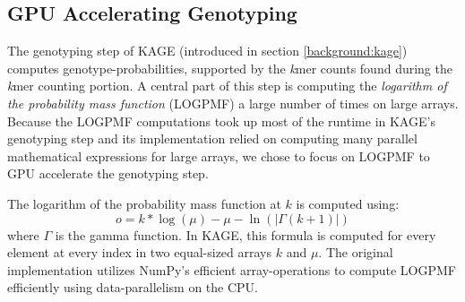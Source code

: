 \subsection{GPU Accelerating Genotyping} \label{methods:gpu_accelerating_genotyping}
The genotyping step of KAGE (introduced in section \ref{background:kage}) computes genotype-probabilities, supported by the \textit{k}mer counts found during the \textit{k}mer counting portion.
A central part of this step is computing the \textit{logarithm of the probability mass function} (LOGPMF) a large number of times on large arrays.
Because the LOGPMF computations took up most of the runtime in KAGE's genotyping step and its implementation relied on computing many parallel mathematical expressions for large arrays, we chose to focus on LOGPMF to GPU accelerate the genotyping step.

The logarithm of the probability mass function at $k$ is computed using:
\begin{equation} \label{methods:gpu_accelerating_genotyping:equations:logpmf}
  o = k * \log(\mu) - \mu - \ln(|\Gamma(k + 1)|)
\end{equation}
where $\Gamma$ is the gamma function.
In KAGE, this formula is computed for every element at every index in two equal-sized arrays $k$ and $\mu$.
The original implementation utilizes NumPy's efficient array-operations to compute LOGPMF efficiently using data-parallelism on the CPU.

